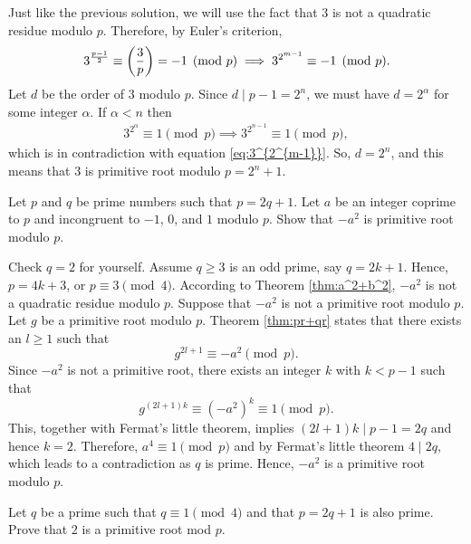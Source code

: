 \documentclass{subfile}
\begin{document}
	\begin{solution}[2]
		Just like the previous solution, we will use the fact that $3$ is not a quadratic residue modulo $p$. Therefore, by Euler's criterion,
			\begin{align}\label{eq:3^{2^{m-1}}}
				3^{\frac{p-1}{2}} \equiv  \left( \frac{3}{p} \right) = -1 \pmod p \implies 3^{2^{m-1}} \equiv -1 \pmod p.
			\end{align}
		Let $d$ be the order of $3$ modulo $p$. Since $d\mid p-1=2^n$, we must have $d=2^{\alpha}$ for some integer $\alpha$. If $\alpha<n$ then
			\begin{align*}
				3^{2^{\alpha}}\equiv 1\pmod{p}\implies 3^{2^{n-1}}\equiv 1\pmod{p},
			\end{align*}
		which is in contradiction with equation \eqref{eq:3^{2^{m-1}}}. So, $d=2^n$, and this means that $3$ is primitive root modulo $p=2^n+1$.
	\end{solution}
	
	\begin{problem}
		Let $p$ and $q$ be prime numbers such that $ p=2q+1$. Let $a$ be an integer coprime to $p$ and incongruent to $-1$, $0$, and $1$ modulo $p$. Show that $ -a^2$ is primitive root modulo $p$.
	\end{problem}
	
	\begin{solution}
		Check $ q=2$ for yourself. Assume $ q \ge 3$ is an odd prime, say $q=2k+1$. Hence, $ p=4k+3$, or $p \equiv 3 \pmod 4$. According to Theorem \ref{thm:a^2+b^2}, $ -a^2$ is not a quadratic residue modulo $ p$. Suppose that $ -a^2$ is not a primitive root modulo $p$. Let $ g$ be a primitive root modulo $p$. Theorem \ref{thm:pr+qr} states that there exists an $ l\ge 1$ such that $$g^{2l+1} \equiv -a^2 \pmod p.$$ Since $-a^2$ is not a primitive root, there exists an integer $k$ with $ k<p-1$ such that \[g^{(2l+1)k} \equiv (-a^2)^k \equiv 1 \pmod p .\] This, together with Fermat's little theorem, implies $ (2l+1)k \mid p-1=2q$ and hence $ k=2$. Therefore, $ a^4 \equiv 1 \pmod p$ and by Fermat's little theorem $ 4\mid 2q$, which leads to a contradiction as $q$ is prime. Hence, $ -a^2$ is a primitive root modulo $p$.
	\end{solution}
	
	\begin{problem}
		Let $q$ be a prime such that $q\equiv 1\pmod 4$ and that $p=2q+1$ is also prime. Prove that $2$ is a primitive root mod $p$.
	\end{problem}
	
\end{document}

